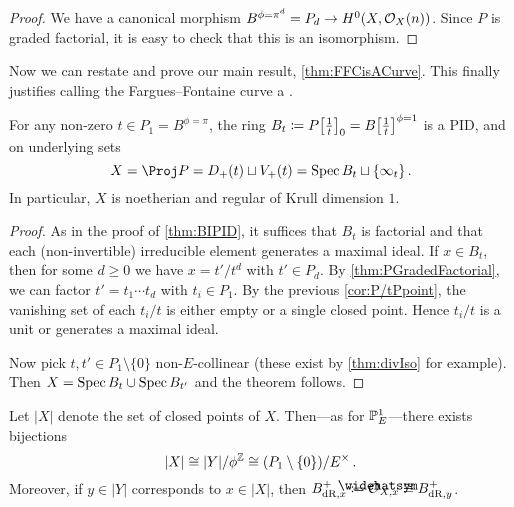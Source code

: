 \documentclass[a4paper, 10pt, oneside, DIV=9, chapterprefix=true, numbers=enddot,bibliography=totoc]{scrbook}
\begin{document}
\begin{proof}
	We have a canonical morphism $B^{\phi=\pi^d}=P_d\morphism H^0(X,\Oo_X(n))$. Since $P$ is graded factorial, it is easy to check that this is an isomorphism.
\end{proof}
Now we can restate and prove our main result, \cref{thm:FFCisACurve}. This finally justifies calling the Fargues--Fontaine curve a .
\begin{thm}\label{thm:FFCisACurveII}
	For any non-zero $t\in P_1=B^{\phi=\pi}$, the ring $B_t\coloneqq P\localize{t}_0=B\localize{t}^{\phi=1}$ is a PID, and on underlying sets
	\begin{equation*}
		X=\Proj P=D_+(t)\sqcup V_+(t)=\Spec B_t\sqcup \{\infty_t\}\,.
	\end{equation*}
	In particular, $X$ is noetherian and regular of Krull dimension $1$.
\end{thm}
\begin{proof}
	As in the proof of \cref{thm:BIPID}, it suffices that $B_t$ is factorial and that each (non-invertible) irreducible element generates a maximal ideal. If $x\in B_t$, then for some $d\geq 0$ we have $x=t'/t^d$ with $t'\in P_d$. By \cref{thm:PGradedFactorial}, we can factor $t'=t_1\dotsm t_d$ with $t_i\in P_1$. By the previous \cref{cor:P/tPpoint}, the vanishing set of each $t_i/t$ is either empty or a single closed point. Hence $t_i/t$ is a unit or generates a maximal ideal.
	
	Now pick $t,t'\in P_1\setminus \{0\}$ non-$E$-collinear (these exist by \cref{thm:divIso} for example). Then $X=\operatorname{Spec} B_t\cup \operatorname{Spec} B_{t'}$ and the theorem follows.
\end{proof}
\begin{lem}\label{lem:BdRx}
	Let $|X|$ denote the set of closed points of $X$. Then---as for $\mathbb{P}_E^1$---there exists bijections
	\begin{equation*}
		|X|\cong |Y|/\phi^\IZ \cong (P_1\setminus\{0\})/E^\times\,.
	\end{equation*}
	Moreover, if $y\in |Y|$ corresponds to $x\in |X|$, then $B_{\dR,x}^+\coloneqq \roof{\Oo}_{X,x}\cong B_{\dR,y}^+$.
\end{lem}
\end{document}
